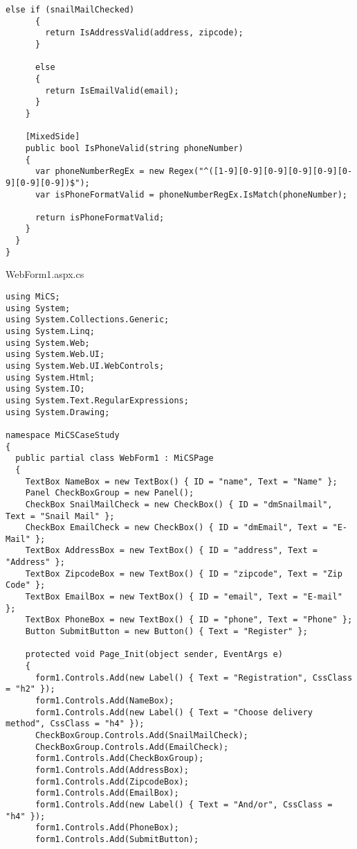 \begin{appendices}
\begin{lstlisting}[language=CSharp,classoffset=1,morekeywords={Default, MiCSPage, Button, CheckBox, TextBox, EventArgs, Label, ClientSide, MixedSide, InputElement, CheckboxElement, Document, Window, Regex, Validator}]
      else if (snailMailChecked)
      {
        return IsAddressValid(address, zipcode);
      }

      else
      {
        return IsEmailValid(email);
      }
    }

    [MixedSide]
    public bool IsPhoneValid(string phoneNumber)
    {
      var phoneNumberRegEx = new Regex("^([1-9][0-9][0-9][0-9][0-9][0-9][0-9][0-9])$");
      var isPhoneFormatValid = phoneNumberRegEx.IsMatch(phoneNumber);

      return isPhoneFormatValid;
    }
  }
}
\end{lstlisting}     

\newpage
WebForm1.aspx.cs

\begin{lstlisting}[language=CSharp,classoffset=1,morekeywords={Default, MiCSPage, Button, CheckBox, TextBox, EventArgs, Label, ClientSide, MixedSide, InputElement, CheckboxElement, Document, Window, Regex, Validator, Color, CheckboxElement}]
using MiCS;
using System;
using System.Collections.Generic;
using System.Linq;
using System.Web;
using System.Web.UI;
using System.Web.UI.WebControls;
using System.Html;
using System.IO;
using System.Text.RegularExpressions;
using System.Drawing;

namespace MiCSCaseStudy
{
  public partial class WebForm1 : MiCSPage
  {
    TextBox NameBox = new TextBox() { ID = "name", Text = "Name" };
    Panel CheckBoxGroup = new Panel();
    CheckBox SnailMailCheck = new CheckBox() { ID = "dmSnailmail", Text = "Snail Mail" };
    CheckBox EmailCheck = new CheckBox() { ID = "dmEmail", Text = "E-Mail" };
    TextBox AddressBox = new TextBox() { ID = "address", Text = "Address" };
    TextBox ZipcodeBox = new TextBox() { ID = "zipcode", Text = "Zip Code" };
    TextBox EmailBox = new TextBox() { ID = "email", Text = "E-mail" };
    TextBox PhoneBox = new TextBox() { ID = "phone", Text = "Phone" };
    Button SubmitButton = new Button() { Text = "Register" };

    protected void Page_Init(object sender, EventArgs e)
    {
      form1.Controls.Add(new Label() { Text = "Registration", CssClass = "h2" });
      form1.Controls.Add(NameBox);
      form1.Controls.Add(new Label() { Text = "Choose delivery method", CssClass = "h4" });
      CheckBoxGroup.Controls.Add(SnailMailCheck);
      CheckBoxGroup.Controls.Add(EmailCheck);
      form1.Controls.Add(CheckBoxGroup);
      form1.Controls.Add(AddressBox);
      form1.Controls.Add(ZipcodeBox);
      form1.Controls.Add(EmailBox);
      form1.Controls.Add(new Label() { Text = "And/or", CssClass = "h4" });
      form1.Controls.Add(PhoneBox);
      form1.Controls.Add(SubmitButton);


\end{lstlisting}
\end{appendices}
